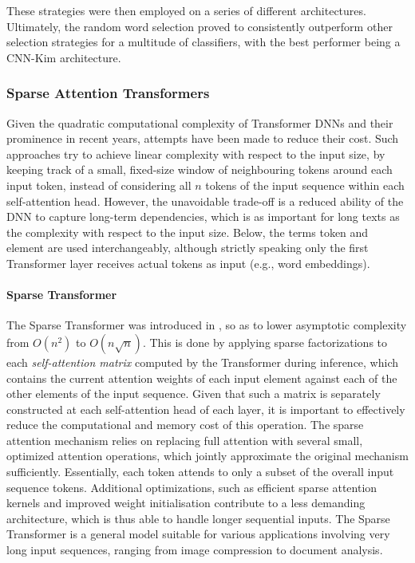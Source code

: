 \documentclass[preprint,review,10pt]{elsarticle}
\begin{document}
	These strategies were then employed on a series of different architectures. Ultimately, the random word selection proved to consistently outperform other selection strategies for a multitude of classifiers, with the best performer being a CNN-Kim \cite{kim} architecture.
	
	\subsubsection{Sparse Attention Transformers}
	Given the quadratic computational complexity of Transformer DNNs and their prominence in recent years, attempts have been made to reduce their cost. Such approaches try to achieve linear complexity with respect to the input size, by keeping track of a small, fixed-size window of neighbouring tokens around each input token, instead of considering all $n$ tokens of the input sequence within each self-attention head. However, the unavoidable trade-off is a reduced ability of the DNN to capture long-term dependencies, which is as important for long texts as the complexity with respect to the input size. Below, the terms token and element are used interchangeably, although strictly speaking only the first Transformer layer receives actual tokens as input (e.g., word embeddings).
	
	\paragraph{Sparse Transformer} The Sparse Transformer was introduced in \cite{child}, so as to lower asymptotic complexity from $O(n^2)$ to $O(n\sqrt{n})$. This is done by applying sparse factorizations to each \textit{self-attention matrix} computed by the Transformer during inference, which contains the current attention weights of each input element against each of the other elements of the input sequence. Given that such a matrix is separately constructed at each self-attention head of each layer, it is important to effectively reduce the computational and memory cost of this operation. The sparse attention mechanism relies on replacing full attention with several small, optimized attention operations, which jointly approximate the original mechanism sufficiently. Essentially, each token attends to only a subset of the overall input sequence tokens. Additional optimizations, such as efficient sparse attention kernels and improved weight initialisation contribute to a less demanding architecture, which is thus able to handle longer sequential inputs. The Sparse Transformer is a general model suitable for various applications involving very long input sequences, ranging from image compression to document analysis.
	
\end{document}
